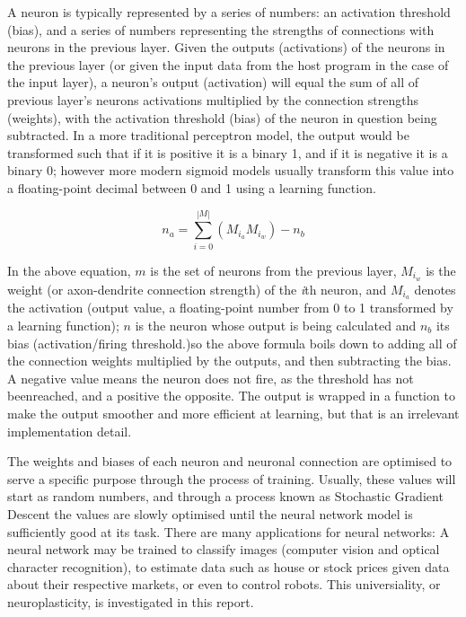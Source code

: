 \documentclass[]{report}
\begin{document}
A neuron is typically represented by a series of numbers: an activation threshold (bias), and a series of numbers representing the strengths of connections with neurons in the previous layer. Given the outputs (activations) of the neurons in the previous layer (or given the input data from the host program in the case of the input layer), a neuron's output (activation) will equal the sum of all of previous layer's neurons activations multiplied by the connection strengths (weights), with the activation threshold (bias) of the neuron in question being subtracted. In a more traditional perceptron model, the output would be transformed such that if it is positive it is a binary 1, and if it is negative it is a binary 0; however more modern sigmoid models usually transform this value into a floating-point decimal between 0 and 1 using a learning function.

\begin{equation}
n_a = \sum_{i=0}^{|M|}(M_{i_a} M_{i_w}) - n_b
\end{equation}

In the above equation, \(m\) is the set of neurons from the previous layer, \(M_{i_w}\) is the weight (or axon-dendrite connection strength) of the \emph{i}th neuron, and \(M_{i_a}\) denotes the activation (output value, a floating-point number from 0 to 1 transformed by a learning function); \(n\) is the neuron whose output is being calculated and \(n_b\) its bias (activation/firing threshold.)so the above formula boils down to adding all of the connection weights multiplied by the outputs, and then subtracting the bias. A negative value means the neuron does not fire, as the threshold has not beenreached, and a positive the opposite. The output is wrapped in a function to make the output smoother and more efficient at learning, but that is an irrelevant implementation detail.

The weights and biases of each neuron and neuronal connection are optimised to serve a specific purpose through the process of training. Usually, these values will start as random numbers, and through a process known as Stochastic Gradient Descent the values are slowly optimised until the neural network model is sufficiently good at its task. There are many applications for neural networks: A neural network may be trained to classify images (computer vision and optical character recognition), to estimate data such as house or stock prices given data about their respective markets, or even to control robots. This universiality, or neuroplasticity, is investigated in this report.
\end{document}
